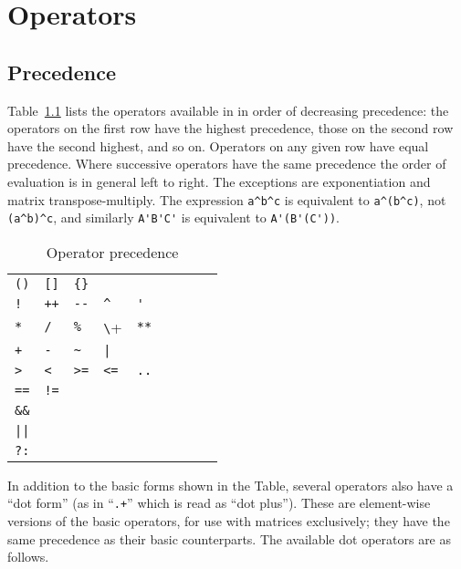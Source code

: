 \chapter{Operators}
\label{chap:operators}

\section{Precedence}

Table~\ref{tab:ops} lists the operators available in  in
order of decreasing precedence: the operators on the first row have
the highest precedence, those on the second row have the second
highest, and so on. Operators on any given row have equal
precedence. Where successive operators have the same precedence the
order of evaluation is in general left to right. The exceptions are
exponentiation and matrix transpose-multiply. The expression
\verb|a^b^c| is equivalent to \verb|a^(b^c)|, not \verb|(a^b)^c|, 
and similarly \verb|A'B'C'| is equivalent to \verb|A'(B'(C'))|.

\begin{table}[htbp]
\caption{Operator precedence}
\label{tab:ops}
\begin{center}
\begin{tabular}{lllllllll}
\verb|()| & \verb|[]| & \verb|{}| \\
\texttt{!} & \texttt{++} & \verb|--| & \verb|^| & \verb|'| \\
\texttt{*} & \texttt{/} & \texttt{\%} & \verb+\+ & \texttt{**} \\
\texttt{+} & \texttt{-} & \verb|~| & \verb+|+ & \\
\verb|>| & \verb|<| & \verb|>=| & \verb|<=| & \texttt{..} \\
\texttt{==} & \texttt{!=} \\
\verb|&&| \\
\verb+||+ \\
\texttt{?:} \\
\end{tabular}
\end{center}
\end{table}

In addition to the basic forms shown in the Table, several operators
also have a ``dot form'' (as in ``\texttt{.+}'' which is read as ``dot
plus''). These are element-wise versions of the basic operators, for
use with matrices exclusively; they have the same precedence as their
basic counterparts. The available dot operators are as follows.


